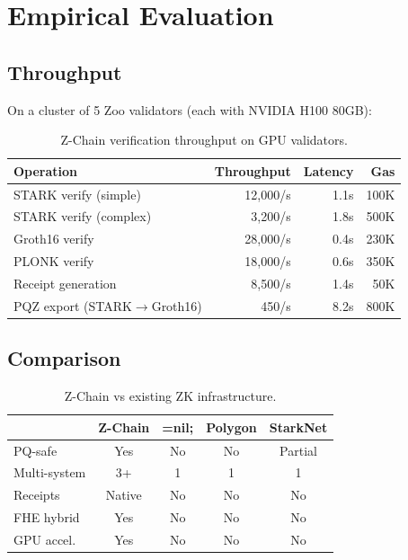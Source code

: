 \section{Empirical Evaluation}


\subsection{Throughput}

On a cluster of 5 Zoo validators (each with NVIDIA H100 80GB):

\begin{table}[h]
\centering
\begin{tabular}{lrrr}
\toprule
\textbf{Operation} & \textbf{Throughput} & \textbf{Latency} & \textbf{Gas} \\
\midrule
STARK verify (simple) & 12,000/s & 1.1s & 100K \\
STARK verify (complex) & 3,200/s & 1.8s & 500K \\
Groth16 verify & 28,000/s & 0.4s & 230K \\
PLONK verify & 18,000/s & 0.6s & 350K \\
Receipt generation & 8,500/s & 1.4s & 50K \\
PQZ export (STARK$\to$Groth16) & 450/s & 8.2s & 800K \\
\bottomrule
\end{tabular}
\caption{Z-Chain verification throughput on GPU validators.}
\end{table}

\subsection{Comparison}

\begin{table}[h]
\centering
\begin{tabular}{lcccc}
\toprule
& \textbf{Z-Chain} & \textbf{=nil;} & \textbf{Polygon} & \textbf{StarkNet} \\
\midrule
PQ-safe & Yes & No & No & Partial \\
Multi-system & 3+ & 1 & 1 & 1 \\
Receipts & Native & No & No & No \\
FHE hybrid & Yes & No & No & No \\
GPU accel. & Yes & No & No & No \\
\bottomrule
\end{tabular}
\caption{Z-Chain vs existing ZK infrastructure.}
\end{table}

